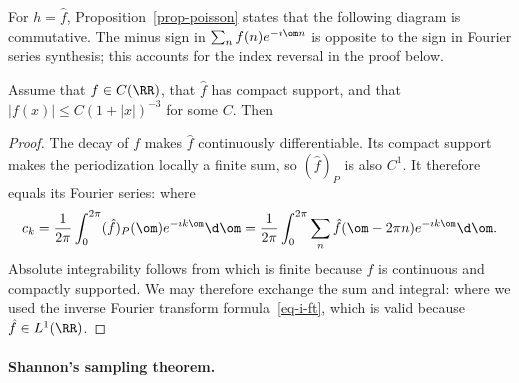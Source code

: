 For $h=\hat f$, Proposition~\ref{prop-poisson} states that the following diagram
is commutative. The minus sign in $\sum_n f(n)e^{-\imath\om n}$ is opposite to the sign in Fourier series synthesis; this accounts for the index reversal in the proof below.

\begin{prop}\label{prop-poisson}
Assume that $f\in C(\RR)$, that $\hat f$ has compact support, and that $|f(x)| \leq C(1+|x|)^{-3}$ for some $C$. Then
\end{prop}
\begin{proof}
	The decay of $f$ makes $\hat f$ continuously differentiable. Its compact support makes the periodization locally a finite sum, so $(\hat f)_P$ is also $C^1$. It therefore equals its Fourier series:
	where
	\begin{align*}
		c_k = \frac{1}{2\pi} \int_0^{2\pi} (\hat f)_P(\om) e^{-\imath k \om} \d \om = 
		\frac{1}{2\pi} \int_0^{2\pi} \sum_n \hat f(\om-2\pi n) e^{-\imath k \om}  \d \om .
	\end{align*}
	Absolute integrability follows from
	which is finite because $\hat f$ is continuous and compactly supported. We may therefore exchange the sum and integral:
	where we used the inverse Fourier transform formula~\eqref{eq-i-ft}, which is valid because $\hat f \in L^1(\RR)$.
\end{proof}

   
\paragraph{Shannon's sampling theorem.}


